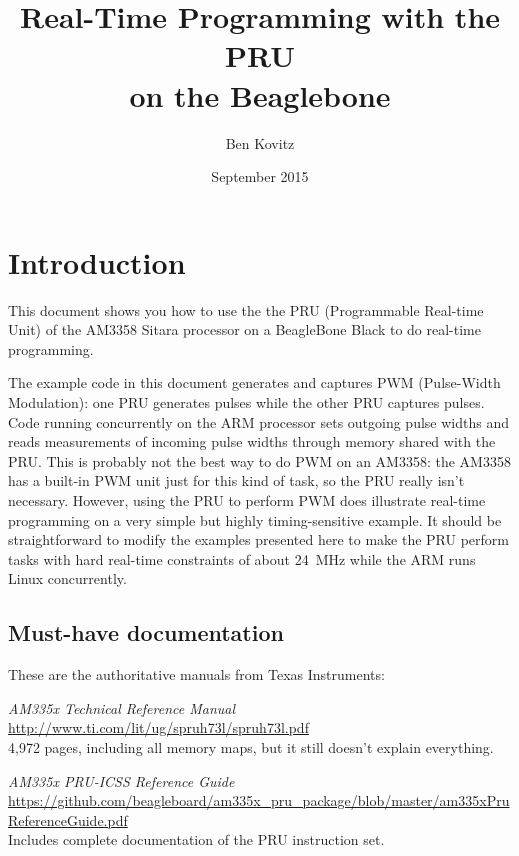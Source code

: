 \documentclass[letterpaper,11pt,fleqn]{article}
\title{Real-Time Programming with the PRU \\ on the Beaglebone}
\author{Ben Kovitz}
\date{September 2015}
\newcommand{\techref}{\textit{AM335x Technical Reference Manual}}
\newenvironment{docref}
   {\vspace{\baselineskip}\noindent\begin{minipage}{\textwidth}\raggedright}
   {\end{minipage}}
\begin{document}
\maketitle

\tableofcontents

\section{Introduction}

This document shows you how to use the the PRU (Programmable Real-time Unit)
of the AM3358 Sitara processor on a BeagleBone Black to do real-time
programming.

The example code in this document generates and captures PWM (Pulse-Width
Modulation): one PRU generates pulses while the other PRU captures pulses.
Code running concurrently on the ARM processor sets outgoing pulse widths and
reads measurements of incoming pulse widths through memory shared with the
PRU.  This is probably not the best way to do PWM on an AM3358: the AM3358 has
a built-in PWM unit just for this kind of task, so the PRU really isn't
necessary. However, using the PRU to perform PWM does illustrate real-time
programming on a very simple but highly timing-sensitive example. It should be
straightforward to modify the examples presented here to make the PRU perform
tasks with hard real-time constraints of about 24~MHz while the ARM runs Linux
concurrently.

\subsection{Must-have documentation}

These are the authoritative manuals from Texas Instruments:

\nopagebreak
\begin{docref}
\techref \\
\url{http://www.ti.com/lit/ug/spruh73l/spruh73l.pdf} \\
4,972 pages, including all memory maps, but it still doesn't explain everything.
\end{docref}

\begin{docref}
\textit{AM335x PRU-ICSS Reference Guide} \\
\url{https://github.com/beagleboard/am335x\_pru\_package/blob/master/am335xPruReferenceGuide.pdf} \\
Includes complete documentation of the PRU instruction set.
\end{docref}
\end{document}
